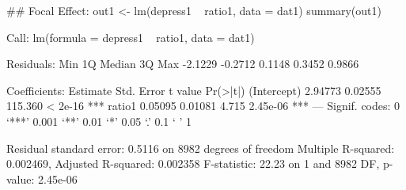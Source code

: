 \begin{Schunk}
\begin{Sinput}
 ## Focal Effect:
 out1 <- lm(depress1 ~ ratio1, data = dat1)
 summary(out1)
\end{Sinput}
\begin{Soutput}
Call:
lm(formula = depress1 ~ ratio1, data = dat1)

Residuals:
    Min      1Q  Median      3Q     Max 
-2.1229 -0.2712  0.1148  0.3452  0.9866 

Coefficients:
            Estimate Std. Error t value Pr(>|t|)    
(Intercept)  2.94773    0.02555 115.360  < 2e-16 ***
ratio1       0.05095    0.01081   4.715 2.45e-06 ***
---
Signif. codes:  0 ‘***’ 0.001 ‘**’ 0.01 ‘*’ 0.05 ‘.’ 0.1 ‘ ’ 1

Residual standard error: 0.5116 on 8982 degrees of freedom
Multiple R-squared:  0.002469,	Adjusted R-squared:  0.002358 
F-statistic: 22.23 on 1 and 8982 DF,  p-value: 2.45e-06
\end{Soutput}
\end{Schunk}
